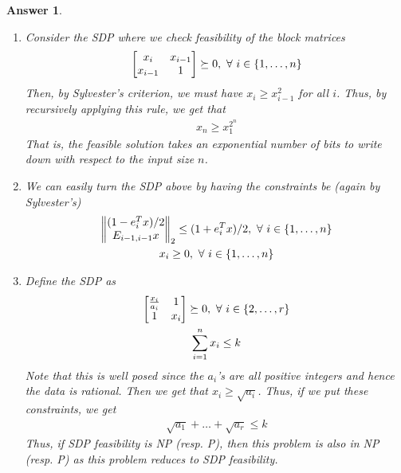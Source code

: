 \documentclass[12pt]{article}
\theoremstyle{colon}
\newtheorem*{answer}{Answer}
\begin{document}
\begin{answer}
  \begin{enumerate}[label=\arabic*)]
    \item Consider the SDP where we check feasibility of the block matrices
      \begin{gather*}
        \begin{bmatrix}
          x_i & x_{i-1} \\
          x_{i-1} & 1
        \end{bmatrix} \succeq 0, \ \forall \ i \in \{1, \mathellipsis, n\}
      \end{gather*}
      Then, by Sylvester's criterion, we must have $x_i \geq x_{i-1}^2$ for all $i$. Thus, by recursively applying this rule, we get that
      \begin{gather*}
        x_n \geq x_1^{2^n}
      \end{gather*}
      That is, the feasible solution takes an exponential number of bits to write down with respect to the input size $n$.

    \item We can easily turn the SDP above by having the constraints be (again by Sylvester's)
      \begin{gather*}
        \left\lVert \begin{matrix} (1 - e_i^T x)/2 \\ E_{i-1, i-1} x \end{matrix} \right\rVert_2 \leq (1 + e_i^T x)/2, \ \forall \ i \in \{1, \mathellipsis, n\} \\
        x_i \geq 0, \ \forall \ i \in \{1, \mathellipsis, n\}
      \end{gather*}

    \item Define the SDP as
      \begin{gather*}
        \begin{bmatrix}
          \frac{x_i}{a_i} & 1 \\
          1 & x_i
        \end{bmatrix} \succeq 0, \ \forall \ i \in \{2, \mathellipsis, r\} \\
        \sum_{i=1}^n x_i \leq k
      \end{gather*}
      Note that this is well posed since the $a_i$'s are all positive integers and hence the data is rational. Then we get that $x_i \geq \sqrt{a_i}$. Thus, if we put these constraints, we get
      \begin{gather*}
        \sqrt{a_1} + \dots + \sqrt{a_r} \leq k
      \end{gather*}
      Thus, if SDP feasibility is NP (resp. P), then this problem is also in NP (resp. P) as this problem reduces to SDP feasibility.
  \end{enumerate}
\end{answer}
\end{document}
